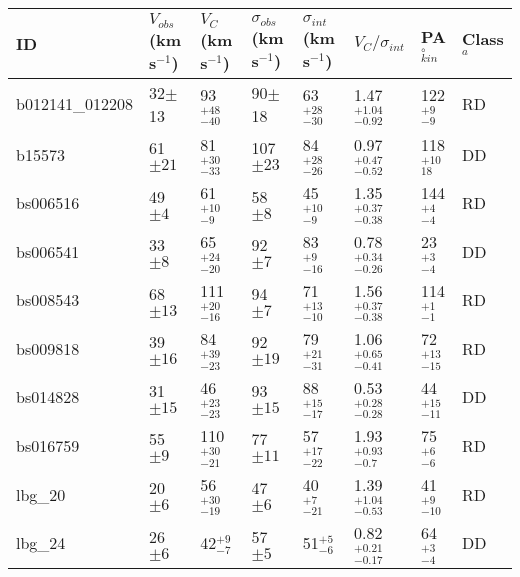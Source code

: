 \documentclass[fleqn,usenatbib]{mnras}
\begin{document}
\begin{table*}
\begin{threeparttable}
\begin{tabular}{llllllll}
 \hline
ID & $V_{obs}$(km\,s$^{-1}$) & $V_{C}$(km\,s$^{-1}$) & $\sigma_{obs}$(km\,s$^{-1}$) & $\sigma_{int}$(km\,s$^{-1}$) & $V_{C}/\sigma_{int}$ & PA$_{kin}^{\circ}$ & Class$^{a}$ \\
 \hline
b012141\_012208 & 32$\pm$13                    & 93$^{+48}_{-40}$                     & 90$\pm$18                 & 63$^{+28}_{-30}$                 & 1.47$^{+1.04}_{-0.92}$             & 122$^{+9}_{-9}$ & RD   \\[1ex]
b15573          & 61$\pm21$                    & 81$^{+30}_{-33}$                     & 107$\pm23$                 & 84$^{+28}_{-26}$          & 0.97$^{+0.47}_{-0.52}$            & 118$^{+10}_{18}$ & DD   \\[1ex]
bs006516        & 49$\pm4$                    & 61$^{+10}_{-9}$                     & 58$\pm8$                  & 45$^{+10}_{-9}$              & 1.35$^{+0.37}_{-0.38}$         & 144$^{+4}_{-4}$ & RD   \\[1ex]
bs006541        & 33$\pm8$                      & 65$^{+24}_{-20}$                  & 92$\pm7$                  & 83$^{+9}_{-16}$             & 0.78$^{+0.34}_{-0.26}$          & 23$^{+3}_{-4}$ & DD    \\[1ex]
bs008543        & 68$\pm13$                    & 111$^{+20}_{-16}$                    & 94$\pm7$                  & 71$^{+13}_{-10}$         & 1.56$^{+0.37}_{-0.38}$                & 114$^{+1}_{-1}$  & RD  \\[1ex]
bs009818        & 39$\pm16$                    & 84$^{+39}_{-23}$                     & 92$\pm19$                  & 79$^{+21}_{-31}$       & 1.06$^{+0.65}_{-0.41}$                   & 72$^{+13}_{-15}$ & RD    \\[1ex]
bs014828        & 31$\pm15$                    & 46$^{+23}_{-23}$                     & 93$\pm15$                  & 88$^{+15}_{-17}$      & 0.53$^{+0.28}_{-0.28}$               & 44$^{+15}_{-11}$  & DD  \\[1ex]
bs016759        & 55$\pm9$                    & 110$^{+30}_{-21}$                    & 77$\pm11$                  & 57$^{+17}_{-22}$         & 1.93$^{+0.93}_{-0.7}$               & 75$^{+6}_{-6}$ & RD    \\[1ex]
lbg\_20         & 20$\pm6$                    & 56$^{+30}_{-19}$                     & 47$\pm6$                  & 40$^{+7}_{-21}$         & 1.39$^{+1.04}_{-0.53}$              & 41$^{+9}_{-10}$ & RD   \\[1ex]
lbg\_24         & 26$\pm6$                    & 42$^{+9}_{-7}$                     & 57$\pm5$                  & 51$^{+5}_{-6}$           & 0.82$^{+0.21}_{-0.17}$          & 64$^{+3}_{-4}$ & DD   \\[1ex]

\end{tabular}
\end{threeparttable}
\end{table*}
\end{document}
